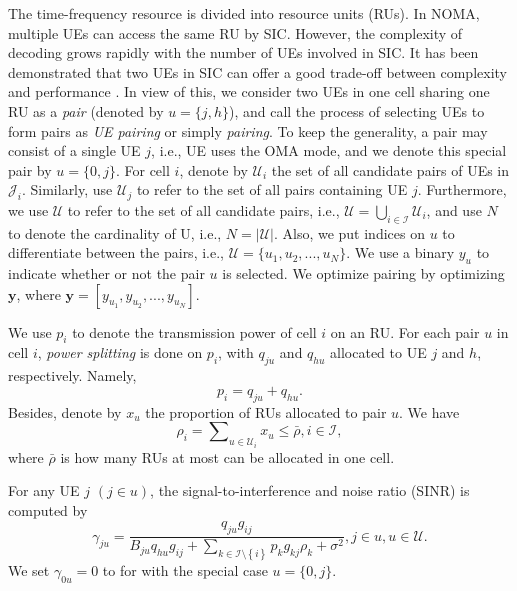 \documentclass[10pt,journal,final,finalsubmission,twocolumn]{IEEEtran}
\begin{document}
The time-frequency resource is divided into resource units (RUs). In NOMA, multiple UEs can access the same RU by SIC. However, the complexity of decoding grows rapidly with the number of UEs involved in SIC. It has been demonstrated that two UEs in SIC can offer a good trade-off between complexity and performance \cite{Islam}. In view of this, we consider two UEs in one cell sharing one RU as a {\em pair} (denoted by $u=\{j,h\}$), and call the process of selecting UEs to form pairs as {\em UE pairing} or simply {\em pairing}. To keep the generality, a pair may consist of a single UE $j$, i.e., UE uses the OMA mode, and we denote this special pair by $u=\{0,j\}$. For cell $i$, denote by $\mathcal{U}_i$ the set of all candidate pairs of UEs in $\mathcal{J}_i$. Similarly, use $\mathcal{U}_j$ to refer to the set of all pairs containing UE $j$. Furthermore, we use ${\mathcal{U}}$ to refer to the set of all candidate pairs, i.e., $\mathcal{U} = \bigcup _{i \in \mathcal{I}}  \mathcal{U}_i$, and use $N$ to denote the cardinality of U, i.e., $N=|\mathcal{U}|$. Also, we put indices on $u$ to differentiate between the pairs, i.e., $\mathcal{U} = \{u_1,u_2,...,u_N\}$. We use a binary $y_{u}$ to indicate whether or not the pair $u$ is selected. We optimize pairing by optimizing $\boldsymbol{y}$, where $\boldsymbol{y} = [y_{u_1},y_{u_2},...,y_{u_N}]$.

We use $p_i$ to denote the transmission power of cell $i$ on an RU. For each pair $u$ in cell $i$, {\em power splitting} is done on $p_i$, with $q_{ju}$ and $q_{hu}$ allocated to UE $j$ and $h$, respectively. Namely,
\begin{equation}
p_i = q_{ju} + q_{hu}.
\end{equation}
Besides, denote by $x_u$ the proportion of RUs allocated to pair $u$. We have
 \begin{equation}
 \rho_i = \sum \nolimits_{u \in {\mathcal{U}}_i} x_u \leq \bar{\rho},  i\in \mathcal{I},
 \end{equation}
where $\bar{\rho}$ is how many RUs at most can be allocated in one cell. 


For any UE $j$ $\left(j \in u\right)$, the signal-to-interference and noise ratio (SINR) is computed by
\begin{equation}
\gamma _{ju} \!=\!\frac{q_{ju}g_{ij}}{{B_{ju}q_{hu}g_{ij}}\!+\!{\sum_{k\in \mathcal{I}\setminus \left \{ i \right \}}p_kg_{kj}\rho_k}\!+\!\sigma ^2}, j\!\in\! u, u \!\in\!{\mathcal{U}}.\label{1111}
\end{equation}
We set $\gamma_{0u} = 0$ to for with the special case $u=\{0,j\}$.
\end{document}
